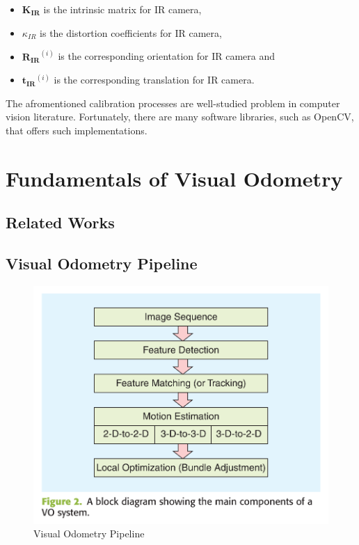 \documentclass[a4paper]{report}
\numberwithin{figure}{section}
\begin{document}
\begin{itemize}
  \item $\mathbf{K_{IR}}$ is the intrinsic matrix for IR camera, 
  \item $\kappa_{IR}$ is the distortion coefficients for IR camera, 
  \item $\mathbf{R_{IR}}^{(i)}$ is the corresponding orientation for IR camera and 
  \item $\mathbf{t_{IR}}^{(i)}$ is the corresponding translation for IR camera.
\end{itemize}


The afromentioned calibration processes are well-studied problem in 
computer vision literature. 
Fortunately, there are many software libraries, such as OpenCV, 
that offers such implementations.


\chapter{Fundamentals of Visual Odometry} \label{cp_vo}

\section{Related Works} \label{sc_visual_odometry_related_works}



\section{Visual Odometry Pipeline} \label{sc_visual_odometry_pipeline}

\begin{figure}[H]
	\centering
	\includegraphics[width=\linewidth,natwidth=640,natheight=640]
  {fig/ref_imgs/vo_pipeline.png}
  \caption{Visual Odometry Pipeline}
	\label{fig:visual_odometry_pipeline}
\end{figure}
\end{document}

